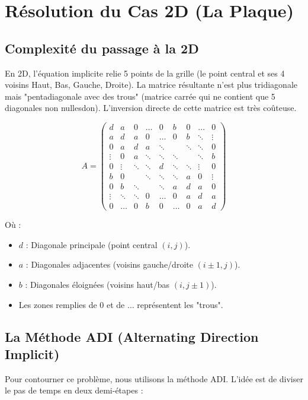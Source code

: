 \documentclass[a4paper,12pt]{article}
\begin{document}
\section{Résolution du Cas 2D (La Plaque)}

\subsection{Complexité du passage à la 2D}
En 2D, l'équation implicite relie 5 points de la grille (le point central et ses 4 voisins Haut, Bas, Gauche, Droite). La matrice résultante n'est plus tridiagonale mais "pentadiagonale avec des trous" (matrice carrée qui ne contient que 5 diagonales non nullesdon). L'inversion directe de cette matrice est très coûteuse.




\begin{equation}
A = 
\begin{pmatrix}
d & a & 0 & \dots & 0 & b & 0 & \dots & 0 \\
a & d & a & 0 & \dots & 0 & b & \ddots & \vdots \\
0 & a & d & a & \ddots & & \ddots & \ddots & 0 \\
\vdots & 0 & a & \ddots & \ddots & \ddots & & \ddots & b \\
0 & \vdots & \ddots & \ddots & d & \ddots & \ddots & \vdots & 0 \\
b & 0 & & \ddots & \ddots & \ddots & a & 0 & \vdots \\
0 & b & \ddots & & \ddots & a & d & a & 0 \\
\vdots & \ddots & \ddots & 0 & \dots & 0 & a & d & a \\
0 & \dots & 0 & b & 0 & \dots & 0 & a & d
\end{pmatrix}
\end{equation}

Où :
\begin{itemize}
    \item $d$ : Diagonale principale (point central $(i,j)$).
    \item $a$ : Diagonales adjacentes (voisins gauche/droite $(i\pm 1, j)$).
    \item $b$ : Diagonales éloignées (voisins haut/bas $(i, j\pm 1)$).
    \item Les zones remplies de $0$ et de $\dots$ représentent les "trous".
\end{itemize}





\subsection{La Méthode ADI (Alternating Direction Implicit)}
Pour contourner ce problème, nous utilisons la méthode ADI. L'idée est de diviser le pas de temps en deux demi-étapes :
\end{document}

